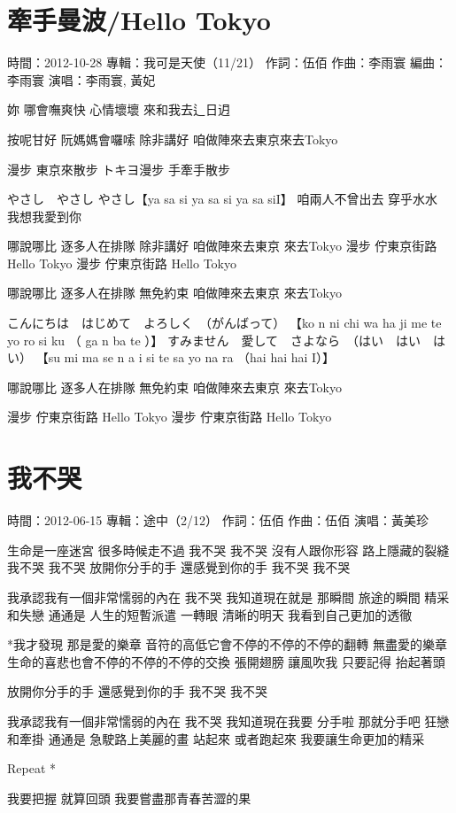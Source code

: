 \documentclass[UTF8,a4paper,oneside,twocolumn,12pt]{ctexbook}
\newcommand{\infopair}[2]{\textbullet #1：#2}
\newcommand{\zc}[1][伍佰]{\infopair{作詞}{#1}}
\newcommand{\zq}[1][伍佰]{\infopair{作曲}{#1}}
\newcommand{\bq}[1][伍佰]{\infopair{編曲}{#1}}
\newcommand{\zj}[1]{\infopair{專輯}{#1}}
\newcommand{\sj}[1]{\infopair{時間}{#1}}
\newenvironment{info}{\begin{flushleft}\kaishu
	}
	{\end{flushleft}\normalsize\yahei\par}
\newenvironment{lyric}{
	}
{}
\begin{document}
\section{牽手曼波/Hello Tokyo}
\begin{info}
	\sj{2012-10-28}
	\zj{我可是天使（11/21）}
	\zc
	\zq[李雨寰]
	\bq[李雨寰]
	\infopair{演唱}{李雨寰, 黃妃}
\end{info}
\begin{lyric}
	妳 哪會嘸爽快 心情壞壞
	來和我去辶日迌

	按呢甘好 阮媽媽會囉嗦
	除非講好 咱做陣來去東京來去Tokyo

	漫步 東京來散步
	トキヨ漫步 手牽手散步

	やさし　やさし やさし【ya sa si ya sa si ya sa siI】
	咱兩人不曾出去 穿乎水水
	我想我愛到你

	哪說哪比 逐多人在排隊
	除非講好 咱做陣來去東京 來去Tokyo
	漫步 佇東京街路 Hello Tokyo
	漫步 佇東京街路 Hello Tokyo


	哪說哪比 逐多人在排隊
	無免約束 咱做陣來去東京 來去Tokyo

	こんにちは　はじめて　よろしく　（がんばって）
	【ko n ni chi wa ha ji me te yo ro si ku （ ga n ba te ）】
	すみません　愛して　さよなら　（はい　はい　はい）
	【su mi ma se n a i si te sa yo na ra （hai hai hai I）】

	哪說哪比 逐多人在排隊
	無免約束 咱做陣來去東京 來去Tokyo

	漫步 佇東京街路 Hello Tokyo
	漫步 佇東京街路 Hello Tokyo
\end{lyric}

\section{我不哭}
\begin{info}
	\sj{2012-06-15}
	\zj{途中（2/12）}
	\zc
	\zq
	\infopair{演唱}{黃美珍}
\end{info}
\begin{lyric}
	生命是一座迷宮
	很多時候走不過
	我不哭 我不哭
	沒有人跟你形容
	路上隱藏的裂縫
	我不哭 我不哭
	放開你分手的手
	還感覺到你的手
	我不哭 我不哭

	我承認我有一個非常懦弱的內在
	我不哭 我知道現在就是
	那瞬間 旅途的瞬間
	精采和失戀 通通是
	人生的短暫派遣
	一轉眼 清晰的明天
	我看到自己更加的透徹

	*我才發現 那是愛的樂章
	音符的高低它會不停的不停的不停的翻轉
	無盡愛的樂章
	生命的喜悲也會不停的不停的不停的交換
	張開翅膀 讓風吹我
	只要記得 抬起著頭

	放開你分手的手
	還感覺到你的手
	我不哭 我不哭

	我承認我有一個非常懦弱的內在
	我不哭 我知道現在我要
	分手啦 那就分手吧
	狂戀和牽掛 通通是
	急駛路上美麗的畫
	站起來 或者跑起來
	我要讓生命更加的精采

	Repeat *

	我要把握 就算回頭
	我要嘗盡那青春苦澀的果
\end{lyric}
\end{document}
